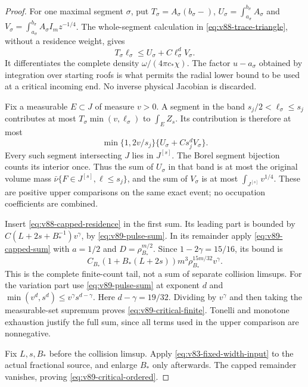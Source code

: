 \begin{proof}
For one maximal segment $\sigma$, put
$T_\sigma=A_\sigma(b_\sigma-)$,
$U_\sigma=\int_{a_\sigma}^{b_\sigma}A_\sigma$ and
$V_\sigma=\int_{a_\sigma}^{b_\sigma}A_\sigma I_m z^{-1/4}$.
The whole-segment calculation in
\eqref{eq:v88-trace-triangle}, without a residence weight, gives
\begin{equation}\label{eq:v89-unweighted-trace}
             T_\sigma\ell_\sigma
                   \le U_\sigma+C\ell_\sigma^d V_\sigma.
\end{equation}
It differentiates the complete density $\omega/(4\pi c_*\chi)$.
The factor $u-a_\sigma$ obtained by integration over starting roofs
is what permits the radial lower bound to be used at a critical
incoming end. No inverse physical Jacobian is discarded.

Fix a measurable $E\subset J$ of measure $v>0$. A segment in the
band $s_j/2<\ell_\sigma\le s_j$ contributes at most
$T_\sigma\min(v,\ell_\sigma)$ to $\int_E Z_s$.
Its contribution is therefore at most
\[
 \min\{1,2v/s_j\}\{U_\sigma+Cs_j^dV_\sigma\}.
\]
Every such segment intersecting $J$ lies in $J^{[s]}$.
The Borel segment bijection counts its interior once. Thus the sum
of $U_\sigma$ in that band is at most the original volume mass
$\bar\nu\{F\in J^{[s]},\ell\le s_j\}$, and the sum of
$V_\sigma$ is at most $\int_{J^{[s]}}v^{1/4}$.
These are positive upper comparisons on the same exact event;
no occupation coefficients are combined.

Insert \eqref{eq:v88-capped-residence} in the first sum. Its leading
part is bounded by $C(L+2s+B_*^{-1})v^\gamma$, by
\eqref{eq:v89-pulse-sum}. In its remainder apply
\eqref{eq:v89-capped-sum} with $a=1/2$ and
$D=\rho_{B_*}^{m/2}$. Since $1-2\gamma=15/16$, its bound is
\[
 C_{B_*}(1+B_*(L+2s))m^3\rho_{B_*}^{15m/32}v^\gamma.
\]
This is the complete finite-count tail, not a sum of separate
collision limsups. For the variation part use
\eqref{eq:v89-pulse-sum} at exponent $d$ and
$\min(v^d,s^d)\le v^\gamma s^{d-\gamma}$.
Here $d-\gamma=19/32$. Dividing by $v^\gamma$ and then taking
the measurable-set supremum proves \eqref{eq:v89-critical-finite}.
Tonelli and monotone exhaustion justify the full sum, since all
terms used in the upper comparison are nonnegative.

Fix $L,s,B_*$ before the collision limsup. Apply
\eqref{eq:v83-fixed-width-input} to the actual fractional source,
and enlarge $B_*$ only afterwards. The capped remainder vanishes,
proving \eqref{eq:v89-critical-ordered}.
\end{proof}

